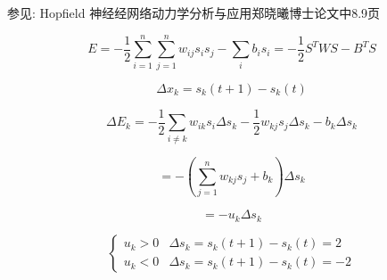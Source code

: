 参见: Hopfield 神经经网络动力学分析与应用郑晓曦博士论文中8.9页

\[
E = -\frac{1}{2}\sum_{i=1}^n\sum_{j=1}^n w_{ij}s_is_j - \sum_i b_is_i = -\frac{1}{2}S^T WS - B^T S
\]

\[
\Delta x_k = s_k(t + 1) - s_k(t)
\]

\[
\Delta E_k = -\frac{1}{2}\sum_{i\neq k}w_{ik}s_i\Delta s_k - \frac{1}{2}w_{kj}s_j\Delta s_k - b_k\Delta s_k
\]

\[
= -(\sum_{j=1}^n w_{kj}s_j + b_k)\Delta s_k
\]

\[
= -u_k\Delta s_k
\]

\[
\begin{cases}
u_k > 0 & \Delta s_k = s_k(t + 1) - s_k(t) = 2 \\
u_k < 0 & \Delta s_k = s_k(t + 1) - s_k(t) = -2
\end{cases}
\]


